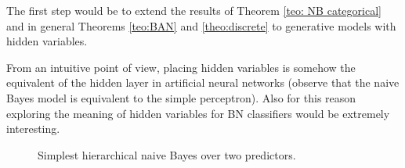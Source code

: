\documentclass[11pt,a4paper, twoside]{book}
\begin{document}
The first step would be to extend the results of Theorem \ref{teo: NB categorical} and in general Theorems \ref{teo:BAN} and \ref{theo:discrete} to generative models with hidden variables.

From an intuitive point of view, placing hidden variables is somehow the equivalent of the hidden layer in artificial neural networks (observe that the naive Bayes model is equivalent to the simple perceptron\citep{rosenblatt1957perceptron}). Also for this reason exploring the meaning of hidden variables for BN classifiers would be extremely interesting.

\begin{figure}
\centering
{}  
\caption{Simplest hierarchical naive Bayes over two predictors.}
\label{fig:simplehiddennb}
\end{figure}




\pagestyle{empty}


\end{document}
